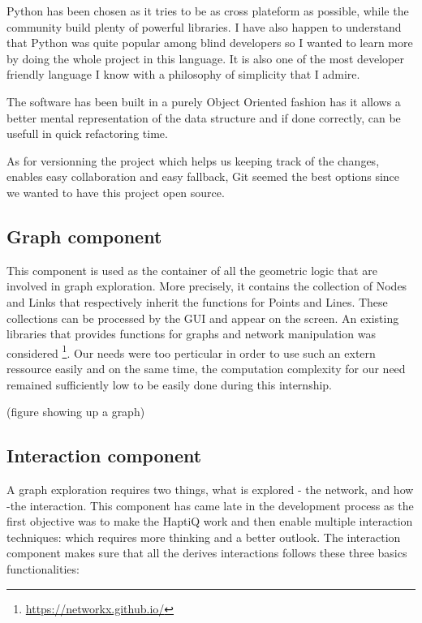 Python has been chosen as it tries to be as cross plateform as possible, while the community build plenty of powerful libraries. I have also happen to understand that Python was quite popular among blind developers so I wanted to learn more by doing the whole project in this language. It is also one of the most developer friendly language I know with a philosophy of simplicity that I admire.

The software has been built in a purely Object Oriented fashion has it allows a better mental representation of the data structure and if done correctly, can be usefull in quick refactoring time.

As for versionning the project which helps us keeping track of the changes, enables easy collaboration and easy fallback, Git seemed the best options since we wanted to have this project open source.

\subsection{Graph component}\label{graph-component}

This component is used as the container of all the geometric logic that
are involved in graph exploration. More precisely, it contains the
collection of Nodes and Links that respectively inherit the functions
for Points and Lines. These collections can be processed by the GUI and
appear on the screen. An existing libraries that provides functions for
graphs and network manipulation was considered \footnote{\url{https://networkx.github.io/}}.
Our needs were too perticular in order to use such an extern ressource
easily and on the same time, the computation complexity for our need
remained sufficiently low to be easily done during this internship.

(figure showing up a graph)

\subsection{Interaction component}\label{interaction-component}

A graph exploration requires two things, what is explored - the network,
and how -the interaction. This component has came late in the
development process as the first objective was to make the HaptiQ work
and then enable multiple interaction techniques: which requires more
thinking and a better outlook. The interaction component makes sure that
all the derives interactions follows these three basics functionalities:

